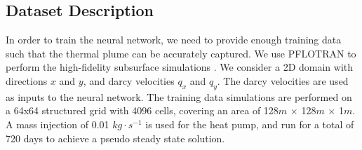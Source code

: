 \documentclass{article} %
\begin{document}
\subsection*{Dataset Description}

In order to train the neural network, we need to provide enough training data such that the thermal plume can be accurately captured. We use PFLOTRAN to perform the high-fidelity subsurface simulations \cite{pflotran-paper}. We consider a 2D domain with directions $x$ and $y$, and darcy velocities $q_x$ and $q_y$. The darcy velocities are used as inputs to the neural network. The training data simulations are performed on a 64x64 structured grid with 4096 cells, covering an area of 128$m$ $\times$ 128$m$ $\times$ 1$m$. A mass injection of 0.01 $kg \cdot s^{-1}$ is used for the heat pump, and run for a total of 720 days to achieve a pseudo steady state solution.







\end{document}
